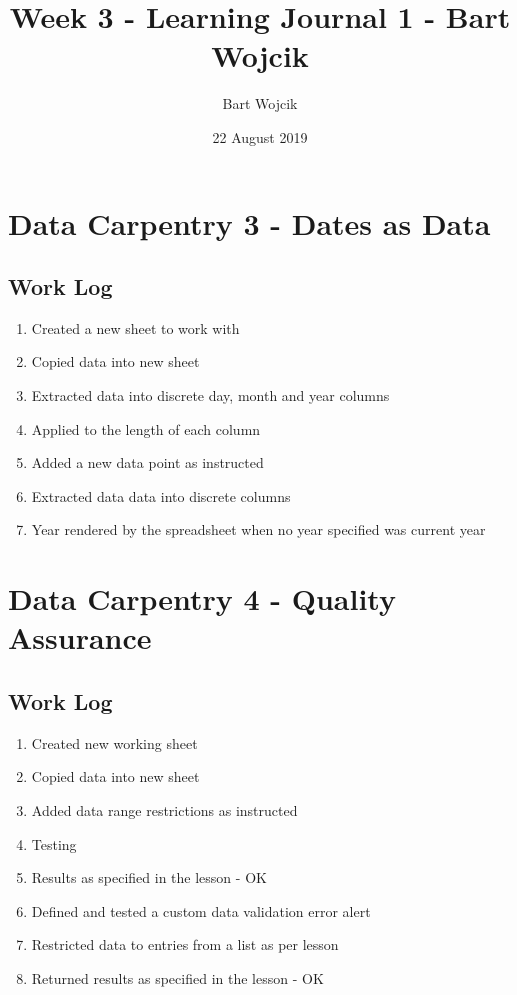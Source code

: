 \documentclass{article}
\title{Week 3 - Learning Journal 1  - Bart Wojcik}
\author{Bart Wojcik}
\date{22 August 2019}
\begin{document}
\maketitle

\section{Data Carpentry 3 - Dates as Data}
\subsection{Work Log}
\begin{enumerate}
    \item Created a new sheet to work with
    \item Copied data into new sheet
    \item Extracted data into discrete day, month and year columns
    \item Applied to the length of each column
    \item Added a new data point as instructed
    \item Extracted data data into discrete columns
    \item Year rendered by the spreadsheet when no year specified was current year
\end{enumerate}

\section{Data Carpentry 4 - Quality Assurance}
\subsection{Work Log}
\begin{enumerate}
    \item Created new working sheet
    \item Copied data into new sheet
    \item Added data range restrictions as instructed
    \item Testing
    \item Results as specified in the lesson - OK
    \item Defined and tested a custom data validation error alert
    \item Restricted data to entries from a list as per lesson
    \item Returned results as specified in the lesson - OK
\end{enumerate}
\end{document}

